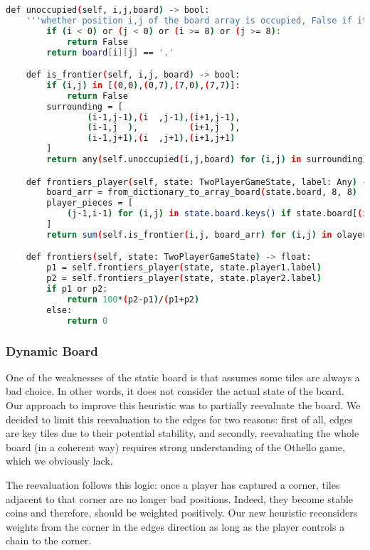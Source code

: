 \documentclass{article}
\begin{document}
\begin{lstlisting}[language=bash, caption = Frontiers detection code,captionpos=t]
    def unoccupied(self, i,j,board) -> bool:
    '''whether position i,j of the board array is occupied, False if it is out of bounds'''
        if (i < 0) or (j < 0) or (i >= 8) or (j >= 8):
            return False 
        return board[i][j] == '.'

    def is_frontier(self, i,j, board) -> bool:
        if (i,j) in [(0,0),(0,7),(7,0),(7,7)]: 
            return False
        surrounding = [
                (i-1,j-1),(i  ,j-1),(i+1,j-1),
                (i-1,j  ),          (i+1,j  ),
                (i-1,j+1),(i  ,j+1),(i+1,j+1)
        ]
        return any(self.unoccupied(i,j,board) for (i,j) in surrounding)

    def frontiers_player(self, state: TwoPlayerGameState, label: Any) -> float:
        board_arr = from_dictionary_to_array_board(state.board, 8, 8)
        player_pieces = [
            (j-1,i-1) for (i,j) in state.board.keys() if state.board[(i,j)] == label
        ]
        return sum(self.is_frontier(i,j, board_arr) for (i,j) in olayer_pieces)

    def frontiers(self, state: TwoPlayerGameState) -> float:
        p1 = self.frontiers_player(state, state.player1.label)
        p2 = self.frontiers_player(state, state.player2.label)
        if p1 or p2:
            return 100*(p2-p1)/(p1+p2)
        else:
            return 0
\end{lstlisting}

\subsubsection{Dynamic Board}\label{dynamic_heuristic}

One of the weaknesses of the static  board is that assumes some tiles are always a bad choice. In other words, it does not consider the actual state of the board. Our approach to improve this heuristic was to partially reevaluate the board. We decided to limit this reevaluation to the edges for two reasons: first of all, edges are key tiles due to their potential stability, and secondly, reevaluating the whole board (in a coherent way) requires strong understanding of the Othello game, which we obviously lack.

The reevaluation follows this logic: once a player has captured a corner, tiles adjacent to that corner are no longer bad positions. Indeed, they become stable coins and therefore, should be weighted positively. Our new heuristic reconsiders weights from the corner in the edges direction as long as the player controls a chain to the corner.
\end{document}
